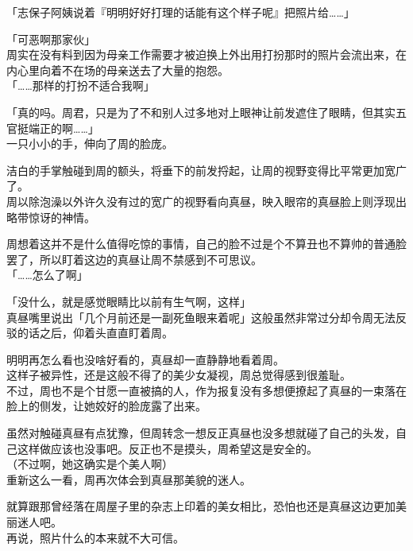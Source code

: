 「志保子阿姨说着『明明好好打理的话能有这个样子呢』把照片给……」

「可恶啊那家伙」\\

周实在没有料到因为母亲工作需要才被迫换上外出用打扮那时的照片会流出来，在内心里向着不在场的母亲送去了大量的抱怨。\\

「……那样的打扮不适合我啊」

「真的吗。周君，只是为了不和别人过多地对上眼神让前发遮住了眼睛，但其实五官挺端正的啊……」\\

一只小小的手，伸向了周的脸庞。

洁白的手掌触碰到周的额头，将垂下的前发捋起，让周的视野变得比平常更加宽广了。\\

周以除泡澡以外许久没有过的宽广的视野看向真昼，映入眼帘的真昼脸上则浮现出略带惊讶的神情。

周想着这并不是什么值得吃惊的事情，自己的脸不过是个不算丑也不算帅的普通脸罢了，所以盯着这边的真昼让周不禁感到不可思议。\\

「……怎么了啊」

「没什么，就是感觉眼睛比以前有生气啊，这样」\\

真昼嘴里说出「几个月前还是一副死鱼眼来着呢」这般虽然非常过分却令周无法反驳的话之后，仰着头直直盯着周。

明明再怎么看也没啥好看的，真昼却一直静静地看着周。\\

这样子被异性，还是这般不得了的美少女凝视，周总觉得感到很羞耻。\\

不过，周也不是个甘愿一直被搞的人，作为报复没有多想便撩起了真昼的一束落在脸上的侧发，让她姣好的脸庞露了出来。

虽然对触碰真昼有点犹豫，但周转念一想反正真昼也没多想就碰了自己的头发，自己这样做应该也没事吧。反正也不是摸头，周希望这是安全的。\\

（不过啊，她这确实是个美人啊）\\

重新这么一看，周再次体会到真昼那美貌的迷人。

就算跟那曾经落在周屋子里的杂志上印着的美女相比，恐怕也还是真昼这边更加美丽迷人吧。\\

再说，照片什么的本来就不大可信。

